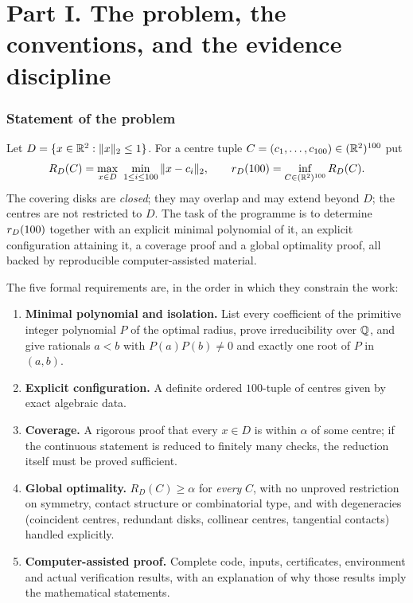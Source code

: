 \part*{Part I. The problem, the conventions, and the evidence discipline}
\setcounter{section}{0}

\section{Statement of the problem}

\begin{definition}
Let $D=\{x\in\mathbb{R}^2:\|x\|_2\le1\}$. For a centre tuple $C=(c_1,\dots,c_{100})\in(\mathbb{R}^2)^{100}$ put
\[
R_D(C)=\max_{x\in D}\ \min_{1\le i\le 100}\|x-c_i\|_2,
\qquad
r_{D}(100)=\inf_{C\in(\mathbb{R}^2)^{100}}R_D(C).
\]
The covering disks are \emph{closed}; they may overlap and may extend beyond $D$; the centres are
not restricted to $D$. The task of the programme is to determine $r_{D}(100)$ together with an
explicit minimal polynomial of it, an explicit configuration attaining it, a coverage proof and a
global optimality proof, all backed by reproducible computer-assisted material.
\end{definition}

The five formal requirements are, in the order in which they constrain the work:
\begin{enumerate}[leftmargin=1.6em,itemsep=2pt]
\item \textbf{Minimal polynomial and isolation.} List every coefficient of the primitive integer
polynomial $P$ of the optimal radius, prove irreducibility over $\mathbb{Q}$, and give rationals $a<b$ with
$P(a)P(b)\ne0$ and exactly one root of $P$ in $(a,b)$.
\item \textbf{Explicit configuration.} A definite ordered $100$-tuple of centres given by exact
algebraic data.
\item \textbf{Coverage.} A rigorous proof that every $x\in D$ is within $\alpha$ of some centre; if
the continuous statement is reduced to finitely many checks, the reduction itself must be proved
sufficient.
\item \textbf{Global optimality.} $R_D(C)\ge\alpha$ for \emph{every} $C$, with no unproved
restriction on symmetry, contact structure or combinatorial type, and with degeneracies
(coincident centres, redundant disks, collinear centres, tangential contacts) handled explicitly.
\item \textbf{Computer-assisted proof.} Complete code, inputs, certificates, environment and actual
verification results, with an explanation of why those results imply the mathematical statements.
\end{enumerate}

